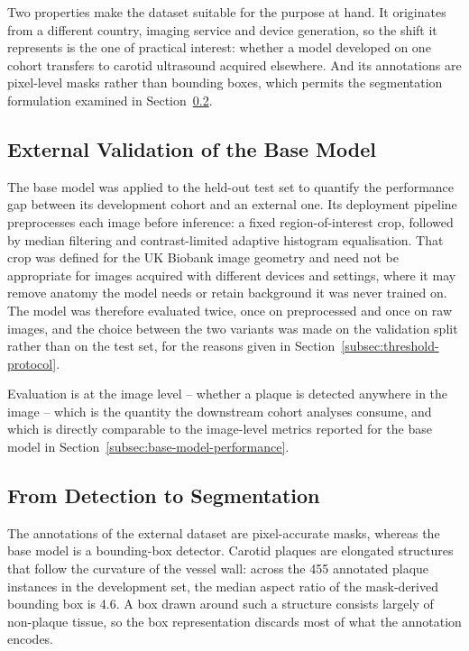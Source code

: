 Two properties make the dataset suitable for the purpose at hand. It originates from a different
country, imaging service and device generation, so the shift it represents is the one of
practical interest: whether a model developed on one cohort transfers to carotid ultrasound
acquired elsewhere. And its annotations are pixel-level masks rather than bounding boxes, which
permits the segmentation formulation examined in
Section~\ref{subsec:detection-to-segmentation}.

\subsection{External Validation of the Base Model}
\label{subsec:external-validation}
The base model was applied to the held-out test set to quantify the performance gap between its
development cohort and an external one. Its deployment pipeline preprocesses each image before inference: a fixed region-of-interest
crop, followed by median filtering and contrast-limited adaptive histogram equalisation. That
crop was defined for the UK Biobank image geometry and need not be appropriate for images
acquired with different devices and settings, where it may remove anatomy the model needs or
retain background it was never trained on. The model was therefore evaluated twice, once on
preprocessed and once on raw images, and the choice between the two variants was made on the
validation split rather than on the test set, for the reasons given in
Section~\ref{subsec:threshold-protocol}.

Evaluation is at the image level -- whether a plaque is detected anywhere in the image -- which is
the quantity the downstream cohort analyses consume, and which is directly comparable to the
image-level metrics reported for the base model in
Section~\ref{subsec:base-model-performance}.

\subsection{From Detection to Segmentation}
\label{subsec:detection-to-segmentation}
The annotations of the external dataset are pixel-accurate masks, whereas the base model is a
bounding-box detector. Carotid plaques are elongated structures that follow the curvature of the
vessel wall: across the 455 annotated plaque instances in the development set, the median aspect
ratio of the mask-derived bounding box is 4.6. A box drawn around such a structure consists
largely of non-plaque tissue, so the box representation discards most of what the annotation
encodes.


